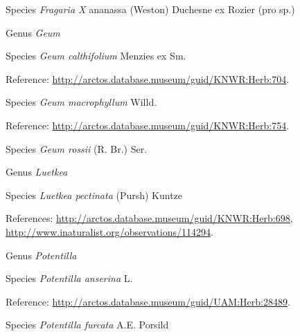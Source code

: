 \documentclass[9pt, article]{memoir}
\begin{document}
\begin{multicols}{2}
\vspace{6pt}\noindent\hspace{36pt}Species \textit{Fragaria X} ananassa (Weston) Duchesne ex Rozier (pro sp.)


\vspace{6pt}\noindent\hspace{30pt}Genus \textit{Geum}


\vspace{6pt}\noindent\hspace{36pt}Species \textit{Geum calthifolium} Menzies ex Sm.


\vspace{6pt}Reference: 
\url{http://arctos.database.museum/guid/KNWR:Herb:704}.

\vspace{6pt}\noindent\hspace{36pt}Species \textit{Geum macrophyllum} Willd.


\vspace{6pt}Reference: 
\url{http://arctos.database.museum/guid/KNWR:Herb:754}.

\vspace{6pt}\noindent\hspace{36pt}Species \textit{Geum rossii} (R. Br.) Ser.


\vspace{6pt}\noindent\hspace{30pt}Genus \textit{Luetkea}


\vspace{6pt}\noindent\hspace{36pt}Species \textit{Luetkea pectinata} (Pursh) Kuntze


\vspace{6pt}References: 
\url{http://arctos.database.museum/guid/KNWR:Herb:698}, 
\url{http://www.inaturalist.org/observations/114294}.

\vspace{6pt}\noindent\hspace{30pt}Genus \textit{Potentilla}


\vspace{6pt}\noindent\hspace{36pt}Species \textit{Potentilla anserina} L.


\vspace{6pt}Reference: 
\url{http://arctos.database.museum/guid/UAM:Herb:28489}.

\vspace{6pt}\noindent\hspace{36pt}Species \textit{Potentilla furcata} A.E. Porsild



\end{multicols}
\end{document}
